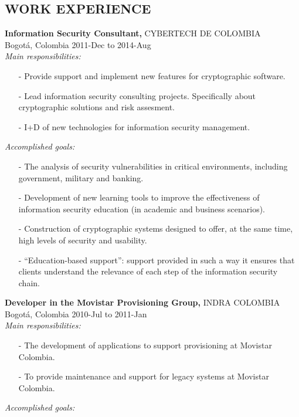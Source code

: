 \documentclass[line,margin]{res}
\begin{document}
 
\thispagestyle{empty} %
\address{Pikk 2 56, Tartu, Estonia}
\address{CEL: (+372) 5196 5545}


\begin{resume}

\vspace{0.1in}
\section{WORK EXPERIENCE} 
    {\bf Information Security Consultant,} CYBERTECH DE COLOMBIA\\
	Bogot\'a, Colombia  2011-Dec to 2014-Aug\\
	\emph{Main responsibilities: }
	
	\begin{itemize}
		\item[-] Provide support and implement new features for cryptographic software.
		\item[-] Lead information security consulting projects. Specifically about cryptographic solutions and risk assesment.
		\item[-] I+D of new technologies for information security management.
	\end{itemize}
	\emph{Accomplished goals: }
	
	\begin{itemize}
		\item[-] The analysis of security vulnerabilities in critical environments, including government, military and banking.
		\item[-] Development of new learning tools to improve the effectiveness of information security education (in academic and business scenarios).
		\item[-] Construction of cryptographic systems designed to offer, at the same time, high levels of security and usability.
		\item[-] ``Education-based support'': support provided in such a way it ensures that clients understand the relevance of each step of the information security chain.
	\end{itemize} 
     {\bf Developer in the Movistar Provisioning Group,} INDRA COLOMBIA\\
	Bogot\'a, Colombia  2010-Jul to 2011-Jan\\	
	\emph{Main responsibilities: }\\	
	\begin{itemize}
		\item[-] The development of applications to support provisioning at Movistar Colombia.
		\item[-] To provide maintenance and support for legacy systems at Movistar Colombia.
	\end{itemize}
	\emph{Accomplished goals: }\\
	

\end{resume}
\end{document}
